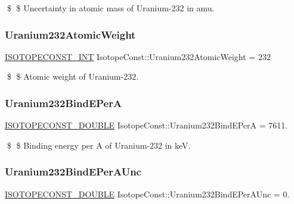 \$ \$ Uncertainty in atomic mass of Uranium-\/232 in amu. \mbox{\label{group___isotope_const-_uranium-_u232_gae4f892dd8d91d0f5c3303a347e968bb6}} 
\subsubsection{\texorpdfstring{Uranium232\+Atomic\+Weight}{Uranium232AtomicWeight}}
{\footnotesize\ttfamily \mbox{\hyperlink{group___isotope_const-_macros_ga5f18360b3e99483a35c32d789e62621c}{I\+S\+O\+T\+O\+P\+E\+C\+O\+N\+S\+T\+\_\+\+I\+NT}} Isotope\+Const\+::\+Uranium232\+Atomic\+Weight = 232}

\$ \$ Atomic weight of Uranium-\/232. \mbox{\label{group___isotope_const-_uranium-_u232_gaa42d43dd4e7f4549cbad079a7be61ff6}} 
\subsubsection{\texorpdfstring{Uranium232\+Bind\+E\+PerA}{Uranium232BindEPerA}}
{\footnotesize\ttfamily \mbox{\hyperlink{group___isotope_const-_macros_ga8f45a7272ce02c0b4c65c44636ed719a}{I\+S\+O\+T\+O\+P\+E\+C\+O\+N\+S\+T\+\_\+\+D\+O\+U\+B\+LE}} Isotope\+Const\+::\+Uranium232\+Bind\+E\+PerA = 7611.}

\$ \$ Binding energy per A of Uranium-\/232 in keV. \mbox{\label{group___isotope_const-_uranium-_u232_ga5ce23620956d15ed16cf45a2a9ce94db}} 
\subsubsection{\texorpdfstring{Uranium232\+Bind\+E\+Per\+A\+Unc}{Uranium232BindEPerAUnc}}
{\footnotesize\ttfamily \mbox{\hyperlink{group___isotope_const-_macros_ga8f45a7272ce02c0b4c65c44636ed719a}{I\+S\+O\+T\+O\+P\+E\+C\+O\+N\+S\+T\+\_\+\+D\+O\+U\+B\+LE}} Isotope\+Const\+::\+Uranium232\+Bind\+E\+Per\+A\+Unc = 0.}


